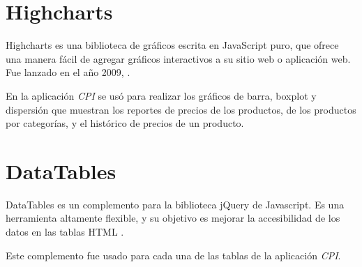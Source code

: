 \section{Highcharts}
Highcharts es una biblioteca de gráficos escrita en JavaScript puro, que ofrece una manera fácil de agregar gráficos interactivos a su sitio web o aplicación web. Fue lanzado en el año 2009, \cite{highcharts}. 

En la aplicación \textit{CPI} se usó para realizar los gráficos de barra, boxplot y dispersión que muestran los reportes de precios de los productos, de los productos por categorías, y el histórico de precios de un producto.


\section{DataTables}
DataTables es un complemento para la biblioteca jQuery de Javascript. Es una herramienta altamente flexible, y su objetivo es mejorar la accesibilidad de los datos en las tablas HTML \cite{dataTables}. 

Este complemento fue usado para cada una de las tablas de la aplicación \textit{CPI}.


